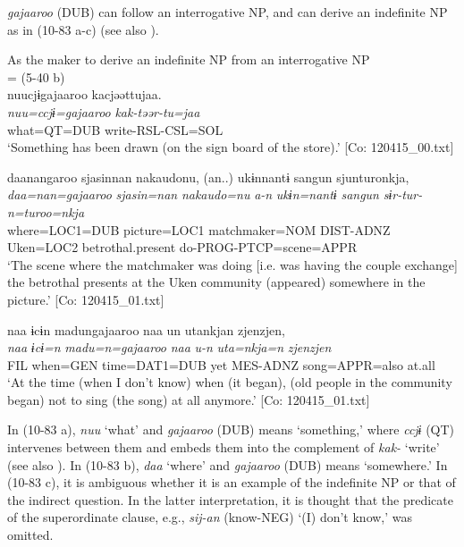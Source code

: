 \begin{xlist}
  \textit{gajaaroo} (DUB) can follow an interrogative NP, and can derive an indefinite NP as in (10-83 a-c) (see also ).

\ea\label{ex:10.83}   As the maker to derive an indefinite NP from an interrogative NP\\
  \ea{} = (5-40 b)\\
      \glll    nuucjɨgajaaroo  kacjəəttujaa.\\
      \textit{nuu=ccjɨ=gajaaroo}  \textit{kak-təər-tu=jaa}\\
      what=QT=DUB  write-RSL-CSL=SOL\\
      \glt       ‘Something has been drawn (on the sign board of the store).’ [Co: 120415\_00.txt]

  \ex  %
      \glll    daanangaroo  sjasinnan  {\textbar}nakaudo{\textbar}nu,  (an..)  ukɨnnantɨ  sangun  sjunturonkja,\\
      \textit{daa=nan=gajaaroo}  \textit{sjasin=nan}  \textit{nakaudo=nu}  \textit{a-n}  \textit{ukɨn=nantɨ}  \textit{sangun}  \textit{sɨr-tur-n=turoo=nkja}\\
      where=LOC1=DUB  picture=LOC1  matchmaker=NOM  DIST-ADNZ  Uken=LOC2  betrothal.present  do-PROG-PTCP=scene=APPR\\
      \glt       ‘The scene where the matchmaker was doing [i.e. was having the couple exchange] the betrothal presents at the Uken community (appeared) somewhere in the picture.’ [Co: 120415\_01.txt]

  \ex  %
      \glll    naa  ɨcɨn  madungajaaroo  naa  un  utankjan  {\textbar}zjenzjen{\textbar},\\
      \textit{naa}  \textit{ɨcɨ=n}  \textit{madu=n=gajaaroo}  \textit{naa}  \textit{u-n}  \textit{uta=nkja=n} \textit{zjenzjen}\\
      FIL  when=GEN  time=DAT1=DUB  yet  MES-ADNZ  song=APPR=also  at.all\\
      \glt       ‘At the time (when I don’t know) when (it began), (old people in the community began) not to sing (the song) at all anymore.’ [Co: 120415\_01.txt]
    \z
\z

In (10-83 a), \textit{nuu} ‘what’ and \textit{gajaaroo} (DUB) means ‘something,’ where \textit{ccjɨ} (QT) intervenes between them and embeds them into the complement of \textit{kak-} ‘write’ (see also ). In (10-83 b), \textit{daa} ‘where’ and \textit{gajaaroo} (DUB) means ‘somewhere.’ In (10-83 c), it is ambiguous whether it is an example of the indefinite NP or that of the indirect question. In the latter interpretation, it is thought that the predicate of the superordinate clause, e.g., \textit{sij-an} (know-NEG) ‘(I) don’t know,’ was omitted.


\end{xlist}
